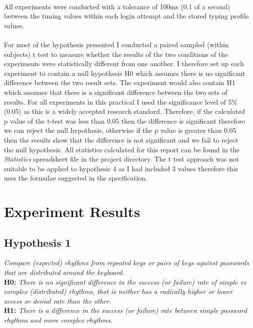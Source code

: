 \documentclass{article}
\begin{document}
\paragraph{}
All experiments were conducted with a tolerance of 100ms (0.1 of a second) between the timing values within each login attempt and the stored typing profile values. 

\paragraph{}
For most of the hypothesis presented I conducted a paired sampled (within subjects) t test to measure whether the results of the two conditions of the experiments were statistically different from one another. I therefore set up each experiment to contain a null hypothesis H0 which assumes there is no significant difference  between the two result sets. The experiment would also contain H1 which assumes that there is a significant difference between the two sets of results. For all experiments in this practical I used the significance level of 5\% (0.05) as this is a widely accepted research standard. Therefore, if the calculated p value of the t-test was less than 0.05 then the difference is significant therefore we can reject the null hypothesis, otherwise if the p value is greater than 0.05 then the results show that the difference is not significant and we fail to reject the null hypothesis. All statistics calculated for this report can be found in the \textit{Statistics} spreadsheet file in the project directory. The t test approach was not suitable to be applied to hypothesis 4 as I had included 3 values therefore this uses the formulae suggested in the specification.  \\

\section{Experiment Results}

\subsection{Hypothesis 1}
\begin{center}
\textit{Compare	(expected) rhythms	from	repeated	keys	or	pairs	of	keys against	passwords that are	distributed	around	the	keyboard.} \newline \\

\textbf{H0:} \textit{There	is	no significant	difference	in	the	success	(or	failure)	rate	of	simple	vs	complex	(distributed)	rhythms,	that	is	neither has	a	radically	higher	or	lower	access	or	denial	rate	than	the	other.} \newline \\

\textbf{H1:} \textit{There is a difference in the	success	(or	failure)	rate	between	simple password rhythms	and	more complex rhythms.}
\end{center}
\end{document}
